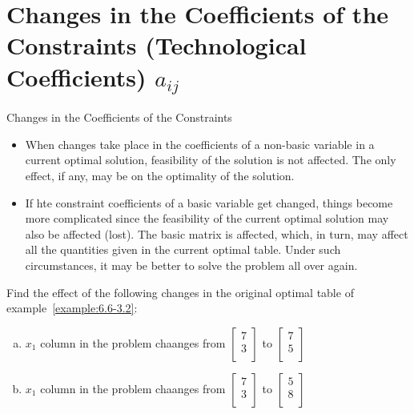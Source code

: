 
\section{Changes in the Coefficients of the Constraints (Technological Coefficients) $a_{ij}$}

\begin{frame}{Changes in the Coefficients of the Constraints}{}
  \begin{itemize} \justifying \parskip5mm
  \item When changes take place in the coefficients of a \alert{non-basic variable} in a current optimal solution, feasibility of the solution is not affected. The only effect, if any, may be on the optimality of the solution.
  \item If hte constraint coefficients of a \alert{basic variable} get changed, things become more complicated since the feasibility of the current optimal solution may also be affected (lost). \alert{The basic matrix is affected}, which, in turn, may affect all the quantities given in the current optimal table. Under such circumstances, \alert{it may be better to solve the problem all over again}.
  \end{itemize}
\end{frame}

\begin{frameExample}{}{}
  Find the effect of the following changes in the original optimal table of example~\ref{example:6.6-3.2}:

  \begin{enumerate}[a)] \justifying \parskip4mm
  \item $x_1$ column in the problem chaanges from %
    $
    \begin{bmatrix}
      7\\3\\
    \end{bmatrix}
    $ to %
    $
    \begin{bmatrix}
      7\\5\\
    \end{bmatrix}
    $
  \item $x_1$ column in the problem chaanges from %
    $
    \begin{bmatrix}
      7\\3\\
    \end{bmatrix}
    $ to %
    $
    \begin{bmatrix}
      5\\8\\
    \end{bmatrix}
    $
  \end{enumerate}
\end{frameExample}




